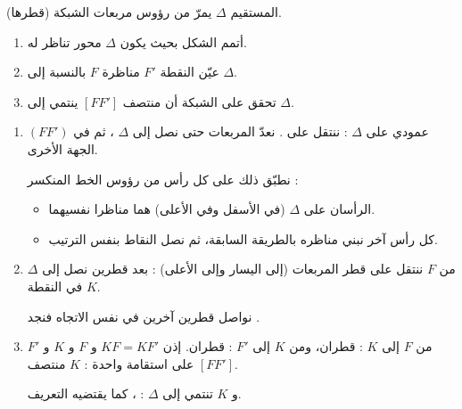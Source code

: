 \documentclass[12pt,a4paper]{article}
\begin{document}
\begin{corr}[title={أتمم الشكل : محور مائل}, stars=2, source={Axiomaths}]
المستقيم $\Delta$ يمرّ من رؤوس مربعات الشبكة (قطرها).
\begin{center}
\end{center}
\begin{enumerate}
  \item أتمم الشكل بحيث يكون $\Delta$ محور تناظر له.
  \item عيّن النقطة $F'$ مناظرة $F$ بالنسبة إلى $\Delta$.
  \item تحقق على الشبكة أن منتصف $[FF']$ ينتمي إلى $\Delta$.
\end{enumerate}
\axsol
\begin{enumerate}[itemsep=14pt]
  \item\leavevmode
  \begin{prop}
  $(FF')$ عمودي على $\Delta$ : ننتقل على . نعدّ المربعات حتى نصل إلى $\Delta$ ، ثم  في الجهة الأخرى.
  \end{prop}
  نطبّق ذلك على كل رأس من رؤوس الخط المنكسر :
  \begin{itemize}
    \item الرأسان على $\Delta$ (في الأسفل وفي الأعلى) هما مناظرا نفسيهما.
    \item كل رأس آخر نبني مناظره بالطريقة السابقة، ثم نصل النقاط بنفس الترتيب.
  \end{itemize}
  \begin{center}
  \end{center}
  \item من $F$ ننتقل على قطر المربعات (إلى اليسار وإلى الأعلى) : بعد قطرين نصل إلى $\Delta$ في النقطة $K$.

  نواصل قطرين آخرين في نفس الاتجاه فنجد .
  \item من $F$ إلى $K$ : قطران، ومن $K$ إلى $F'$ : قطران. إذن $KF=KF'$ و $F$ و $K$ و $F'$ على استقامة واحدة : $K$ منتصف $[FF']$.

  و $K$ تنتمي إلى $\Delta$ : ، كما يقتضيه التعريف.
\end{enumerate}
\end{corr}
\end{document}
